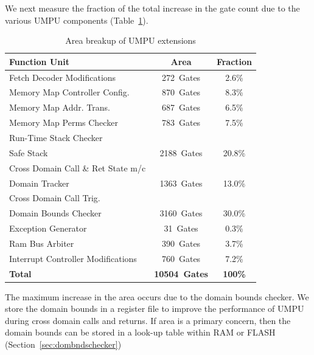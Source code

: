 %
We next measure the fraction of the total increase in the gate count
due to the various UMPU components (Table~\ref{tab:umpuareacomp}).
%
\begin{table}[htdp]
\centering
\small{\def\X{\hphantom{0}}\def\XX{\X\X}\def\XXX{\XX\X}\def\Y{\raise1pt\hbox{\strut}}
\begin{tabular}{|l|c|c|}
	\hline
        \hline
	\textbf{Function Unit} & \textbf{Area} & \textbf{Fraction}\\
	\hline
        \hline
        Fetch Decoder Modifications & \XX{}272~Gates & \XX{}2.6\%\\
        \hline
	Memory Map Controller Config. & \XX{}870~Gates & \XX{}8.3\%\\
        \hline
        Memory Map Addr. Trans.       & \XX{}687~Gates & \XX{}6.5\%\\
        \hline
        Memory Map Perms Checker & \XX{}783~Gates& \XX{}7.5\%\\
        Run-Time Stack Checker & & \\
        \hline
        Safe Stack & \X{}2188~Gates & \X{}20.8\%\\
        Cross Domain Call \& Ret State m/c & &\\
	\hline
        Domain Tracker & \X{}1363~Gates & \X{}13.0\%\\
        Cross Domain Call Trig. &&\\
        \hline
        Domain Bounds Checker & \X{}3160~Gates & \X{}30.0\%\\
        \hline
        Exception Generator & \XXX{}31~Gates & \XX{}0.3\%\\
        \hline
        Ram Bus Arbiter & \XX{}390~Gates & \XX{}3.7\%\\
        \hline
        Interrupt Controller Modifications & \XX{}760~Gates & \XX{}7.2\%\\
        \hline
        \hline
        \textbf{Total} & \textbf{10504~Gates} & \textbf{100\%}\\
        \hline
        \hline
\end{tabular}}
\caption{Area breakup of UMPU extensions}
\label{tab:umpuareacomp}
\end{table}

%
The maximum increase in the area occurs due to the domain bounds
checker.
%
We store the domain bounds in a register file to improve the
performance of UMPU during cross domain calls and returns.
%
If area is a primary concern, then the domain bounds can be stored in
a look-up table within RAM or FLASH (Section~\ref{sec:dombndschecker})
%
